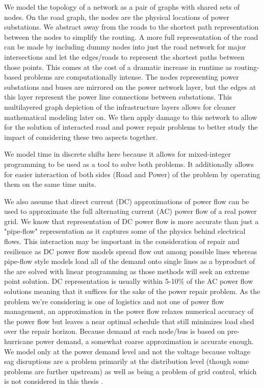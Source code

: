 \documentclass{article}
\begin{document}
	We model the topology of a network as a pair of graphs with shared sets of nodes. On the road graph, the nodes are the physical locations of power substations. We abstract away from the roads to the shortest path representation between the nodes to simplify the routing. A more full representation of the road can be made by including dummy nodes into just the road network for major intersections and let the edges/roads to represent the shortest paths between those points. This comes at the cost of a dramatic increase in runtime as routing-based problems are computationally intense. The nodes representing power substations and buses are mirrored on the power network layer, but the edges at this layer represent the power line connections between substations. This multilayered graph depiction of the infrastructure layers allows for cleaner mathematical modeling later on. We then apply damage to this network to allow for the solution of interacted road and power repair problems to better study the impact of considering these two aspects together.
		
	We model time in discrete shifts here because it allows for mixed-integer programming to be used as a tool to solve both problems. It additionally allows for easier interaction of both sides (Road and Power) of the problem by operating them on the same time units. 
	
	We also assume that direct current (DC) approximations of power flow can be used to approximate the full alternating current (AC) power flow of a real power grid. We know that representation of DC power flow is more accurate than just a "pipe-flow" representation as it captures some of the physics behind electrical flows. This interaction may be important in the consideration of repair and resilience as DC power flow models spread flow out among possible lines whereas pipe-flow style models load all of the demand onto single lines as a byproduct of the are solved with linear programming as those methods will seek an extreme point solution. DC representation is usually within 5-10\% of the AC power flow solutions \cite{Frank2016} \cite{StottEA2009} meaning that it suffices for the sake of the power repair problem. As the problem we're considering is one of logistics and not one of power flow management, an approximation in the power flow relaxes numerical accuracy of the power flow but leaves a near optimal schedule that still minimizes load shed over the repair horizon. Because demand at each node/bus is based on pre-hurricane power demand, a somewhat coarse approximation is accurate enough. We model only at the power demand level and not the voltage because voltage sag disruptions are a problem primarily at the distribution level (though some problems are further upstream) \cite{LamoreeEA1994} as well as being a problem of grid control, which is not considered in this thesis \cite{MiretEA2013}.  
	
\end{document}
